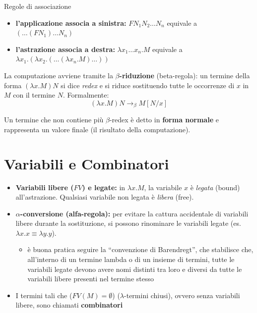 \documentclass[a4paper,11pt]{report}
\begin{document}
\begin{gframe}{Regole di associazione}
    \begin{itemize}
        \item \textbf{l'applicazione associa a sinistra:} $F N_1 N_2 \dots N_n$ equivale a $(\dots (F N_1) \dots N_n)$
        \item \textbf{l'astrazione associa a destra:} $\lambda x_1 \dots x_n. M$ equivale a $\lambda x_1. (\lambda x_2. (\dots (\lambda x_n. M)\dots))$
    \end{itemize}
\end{gframe}

La computazione avviene tramite la \textbf{$\beta$-riduzione} (beta-regola): un termine della forma $(\lambda x.M) N$ si dice \textit{redex} e si riduce sostituendo tutte le occorrenze di $x$ in $M$ con il termine $N$.
Formalmente:
$$(\lambda x.M) N \rightarrow_\beta M[N/x]$$

Un termine che non contiene più $\beta$-redex è detto in \textbf{forma normale} e rappresenta un valore finale (il risultato della computazione).

\section{Variabili e Combinatori}
\begin{itemize}
    \item \textbf{Variabili libere ($FV$) e legate:} in $\lambda x. M$, la variabile $x$ è \textit{legata} (bound) all'astrazione. Qualsiasi variabile non legata è \textit{libera} (free).
    \item \textbf{$\alpha$-conversione (alfa-regola):} per evitare la cattura accidentale di variabili libere durante la sostituzione, si possono rinominare le variabili legate (es. $\lambda x.x \equiv \lambda y.y$). 
        \begin{itemize}
            \item è buona pratica seguire la ``convenzione di Barendregt'', che stabilisce che, all'interno di un termine lambda o di un insieme di termini, tutte le variabili legate devono avere nomi distinti tra loro e diversi da tutte le variabili libere presenti nel termine stesso
        \end{itemize} 
    \item  I termini tali che ($FV(M) = \emptyset$) ($\lambda$-termini chiusi), ovvero senza variabili libere, sono chiamati \textbf{combinatori}
\end{itemize}
\end{document}
